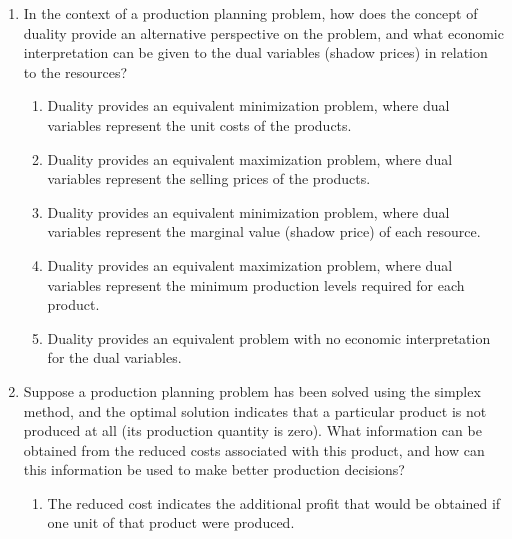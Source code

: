 \documentclass{article}%
\begin{document}
\begin{enumerate}
\begin{enumerate}
\item Constraints are formulated by setting upper bounds on the resource consumption for each resource, and technological coefficients represent the amount of each resource required to produce one unit of each product.%
\item Constraints are formulated by setting lower bounds on the resource consumption, and technological coefficients represent the unit costs of each resource.%
\item Constraints are formulated by setting upper bounds on the total profit, and technological coefficients represent the production quantities of each product.%
\end{enumerate}%
\vspace{1em}%
\item In the context of a production planning problem, how does the concept of duality provide an alternative perspective on the problem, and what economic interpretation can be given to the dual variables (shadow prices) in relation to the resources?%
\begin{enumerate}%
\item Duality provides an equivalent minimization problem, where dual variables represent the unit costs of the products.%
\item Duality provides an equivalent maximization problem, where dual variables represent the selling prices of the products.%
\item Duality provides an equivalent minimization problem, where dual variables represent the marginal value (shadow price) of each resource.%
\item Duality provides an equivalent maximization problem, where dual variables represent the minimum production levels required for each product.%
\item Duality provides an equivalent problem with no economic interpretation for the dual variables.%
\end{enumerate}%
\vspace{1em}%
\item Suppose a production planning problem has been solved using the simplex method, and the optimal solution indicates that a particular product is not produced at all (its production quantity is zero).  What information can be obtained from the reduced costs associated with this product, and how can this information be used to make better production decisions?%
\begin{enumerate}%
\item The reduced cost indicates the additional profit that would be obtained if one unit of that product were produced.%

\end{enumerate}
\end{enumerate}
\end{document}
